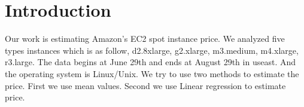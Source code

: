 \documentclass[
10pt, %
a4paper, %
oneside, %
headinclude,footinclude, %
BCOR5mm, %
]{scrartcl}
\title{\normalfont\spacedallcaps{Document of current works}} %
\author{\spacedlowsmallcaps{}} %
\date{2016-9-6} %
\begin{document}

\renewcommand{\sectionmark}[1]{\markright{\spacedlowsmallcaps{#1}}} %
\lehead{\mbox{\llap{\small\thepage\kern1em\color{halfgray} \vline}\color{halfgray}\hspace{0.5em}\rightmark\hfil}} %

\pagestyle{scrheadings} %


\maketitle %

\setcounter{tocdepth}{2} %

\tableofcontents %


\listoftables %



\newpage %


\section{Introduction}

Our work is estimating Amazon’s EC2 spot instance price. We analyzed five types instances which is as follow, d2.8xlarge, g2.xlarge, m3.medium, m4.xlarge, r3.large. The data begins at June 29th and ends at August 29th in useast. And the operating system is Linux/Unix. We try to use two methods to estimate the price. First we use mean values. Second we use Linear regression to estimate price.
 
\end{document}
